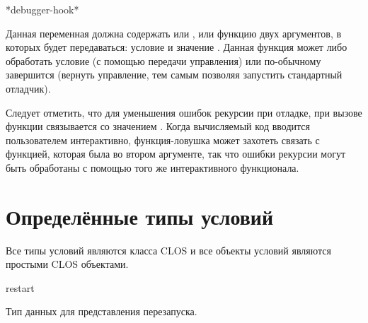 \begin{defun}[Переменная]
*debugger-hook*

Данная переменная должна содержать или , или функцию двух аргументов, в
которых будет передаваться: условие и значение . Данная
функция может либо обработать условие (с помощью передачи управления) или
по-обычному завершится (вернуть управление, тем самым позволяя запустить
стандартный отладчик).

Следует отметить, что для уменьшения ошибок рекурсии при отладке, при вызове функции
 связывается со значением . Когда вычисляемый код
вводится пользователем интерактивно, функция-ловушка может захотеть связать
 с функцией, которая была во втором аргументе, так что
ошибки рекурсии могут быть обработаны с помощью того же интерактивного функционала.
\end{defun}

\section{Определённые типы условий}        
\label{PREDEFINED-CONDITIONS-SECTION}

Все типы условий являются класса CLOS и все объекты условий являются простыми
CLOS объектами.

\begin{defun}[Тип]
restart 

Тип данных для представления перезапуска.
\end{defun}

